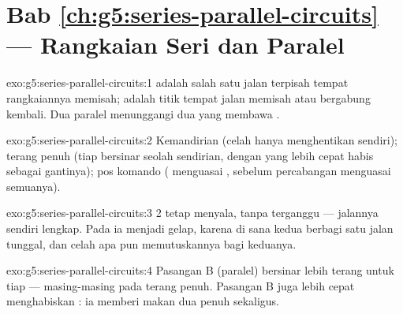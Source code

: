 \section*{Bab \ref{ch:g5:series-parallel-circuits} --- Rangkaian Seri dan Paralel}

\begin{solution}{exo:g5:series-parallel-circuits:1}
 adalah salah satu jalan terpisah tempat rangkaiannya memisah;
 adalah titik tempat jalan memisah atau bergabung kembali.
Dua  paralel menunggangi dua  yang membawa .
\end{solution}

\begin{solution}{exo:g5:series-parallel-circuits:2}
Kemandirian (celah hanya menghentikan  sendiri); terang penuh
(tiap  bersinar seolah sendirian, dengan  yang lebih
cepat habis sebagai gantinya); pos komando (  menguasai
,  sebelum percabangan menguasai semuanya).
\end{solution}

\begin{solution}{exo:g5:series-parallel-circuits:3}
 2 tetap menyala, tanpa terganggu --- jalannya sendiri lengkap.
Pada  ia menjadi gelap, karena di sana kedua 
berbagi satu jalan tunggal, dan celah apa pun memutuskannya bagi
keduanya.
\end{solution}

\begin{solution}{exo:g5:series-parallel-circuits:4}
Pasangan B (paralel) bersinar lebih terang untuk tiap  ---
masing-masing pada terang penuh. Pasangan B juga lebih cepat
menghabiskan : ia memberi makan dua  penuh sekaligus.
\end{solution}

